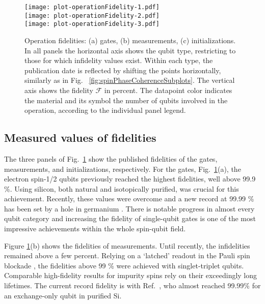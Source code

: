 \documentclass[aps, prx, showpacs, twocolumn, superscriptaddress, notitlepage, longbibliography, floatfix, nofootinbib]{revtex4-2}
\newcommand{\recheck}[1]{{#1}}
\begin{document}
\begin{figure}[ht!]
  \texttt{[image: plot-operationFidelity-1.pdf]} \hfill\\
  \texttt{[image: plot-operationFidelity-2.pdf]} \hfill\\
  \texttt{[image: plot-operationFidelity-3.pdf]} \hfill\\
  \caption{
    \label{fig:operationInfidelities}
  Operation fidelities: (a) gates, (b) measurements, (c) initializations. In all panels the horizontal axis shows the qubit type, restricting to those for which infidelity values exist. Within each type, the publication date is reflected by shifting the points horizontally, similarly as in Fig. ~\ref{fig:spinPhaseCoherenceSubplots}. The vertical axis shows the fidelity $\mathcal{F}$ in percent. The datapoint color indicates the material and its symbol the number of qubits involved in the operation, according to the individual panel legend.
  }
\end{figure}

\subsection{Measured values of fidelities}

The three panels of Fig.~\ref{fig:operationInfidelities} show the published fidelities of the gates, measurements, and initializations, respectively. For the gates, Fig.~\ref{fig:operationInfidelities}(a), \recheck{the electron spin-1/2 qubits previously reached the highest fidelities, well above 99.9 \%. Using silicon, both natural and isotopically purified, was crucial for this achievement. Recently, these values were overcome and a new record at 99.99 \% has been set by a hole in germanium \cite{lawrie_simultaneous_2023}.} \recheck{There is notable progress in almost every qubit category} and increasing the fidelity of single-qubit gates is one of the most impressive achievements within the whole spin-qubit field. 

Figure \ref{fig:operationInfidelities}(b) shows the fidelities of measurements. \recheck{Until recently, the infidelities remained above a few percent.} \recheck{Relying on a `latched' readout in the Pauli spin blockade \cite{nakajima_robust_2017,broome_high-fidelity_2017}, the fidelities above 99 \% were achieved with singlet-triplet qubits. Comparable high-fidelity results for impurity spins rely on their exceedingly long lifetimes. The current record fidelity is with Ref.~\cite{blumoff_fast_2022}, who almost reached 99.99\% for an exchange-only qubit in purified Si.}
\end{document}
